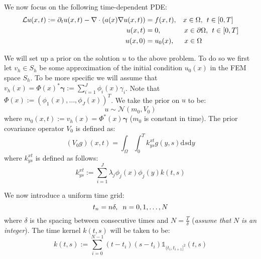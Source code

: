 \documentclass{article}
\theoremstyle{definition}
\theoremstyle{remark}
\theoremstyle{remark}
\begin{document}
\setlength\parskip{10pt}
\setlength\parindent{20pt}

\noindent We now focus on the following time-dependent PDE:
\begin{align}
        \mathcal{L}u(x,t) := \partial_{t}u(x,t) -\nabla\cdot(a(x)\nabla u(x,t))&=f(x,t), \hspace{0.3cm} x\in\Omega, \hspace{0.15cm} t\in[0,T] \\
        u(x,t) &= 0, \hspace{1.15cm} x\in\partial\Omega, \hspace{0.15cm} t\in[0,T] \\
        u(x,0) &= u_{0}(x), \hspace{0.5cm} x\in\Omega
\end{align}

\noindent We will set up a prior on the solution $u$ to the above problem. To do so we first let $v_{h}\in S_{h}$ be some approximation of the initial condition $u_{0}(x)$ in the FEM space $S_{h}$. To be more specific we will assume that $v_{h}(x)=\Phi(x)^{*}\boldsymbol{\gamma}:=\sum_{i=1}^{J}\phi_{i}(x)\gamma_{i}$. Note that $\Phi(x):=(\phi_{1}(x),\dots,\phi_{J}(x))^{T}$. We take the prior on $u$ to be:
\begin{equation}
    u\sim\mathcal{N}(m_{0},V_{0})
\end{equation}
where $m_{0}(x,t):=v_{h}(x)=\Phi^{*}(x)\boldsymbol{\gamma}$ ($m_{0}$ is constant in time). The prior covariance operator $V_{0}$ is defined as:
\begin{equation}
    (V_{0}g)(x,t)=\int_{\Omega}\int_{0}^{T}k_{ys}^{xt}g(y,s)\mathrm{d}s\mathrm{d}y
\end{equation}
where $k_{ys}^{xt}$ is defined as follows:
\begin{equation}
    k_{ys}^{xt}:=\sum_{i=1}^{J}\lambda_{j}\phi_{j}(x)\phi_{j}(y)k(t,s)
\end{equation}

\noindent We now introduce a uniform time grid:
\begin{equation*}
    t_{n}=n\delta, \hspace{0.2cm} n=0,1,\dots,N
\end{equation*}
where $\delta$ is the spacing between consecutive times and $N=\frac{T}{\delta}$ (\textit{assume that} $N$ \textit{is an integer}). The time kernel $k(t,s)$ will be taken to be:
\begin{equation}
    k(t,s):=\sum_{i=0}^{N-1}(t-t_{i})(s-t_{i})\mathbb{1}_{(t_{i},t_{i+1}]^{2}}(t,s)
\end{equation}
\end{document}
